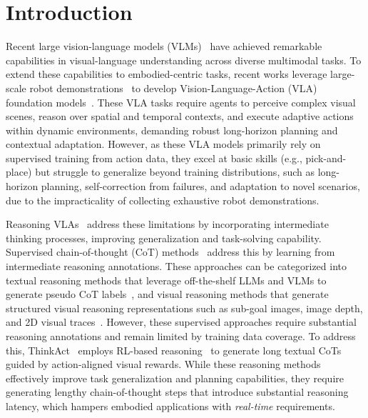 \section{Introduction}
\label{sec:intro}




Recent large vision-language models (VLMs)~\cite{liu2023visual,comanici2025gemini,liu2024nvila,bai2025qwen2,shi2024eagle,li2025eagle,chen2025eagle,wang2025internvl3,xie2024show} have achieved remarkable capabilities in visual-language understanding across diverse multimodal tasks. To extend these capabilities to embodied-centric tasks, recent works leverage large-scale robot demonstrations~\cite{o2024open} to develop Vision-Language-Action (VLA) foundation models~\cite{brohan2022rt,brohan2023rt,team2024octo,bjorck2025gr00t,li2025hamster,black2024pi_0,yang2025magma,kim24openvla}. These VLA tasks require agents to perceive complex visual scenes, reason over spatial and temporal contexts, and execute adaptive actions within dynamic environments, demanding robust long-horizon planning and contextual adaptation. However, as these VLA models primarily rely on supervised training from action data, they excel at basic skills (e.g., pick-and-place) but struggle to generalize beyond training distributions, such as long-horizon planning, self-correction from failures, and adaptation to novel scenarios, due to the impracticality of collecting exhaustive robot demonstrations.


Reasoning VLAs~\cite{zawalski2024robotic,zhao2025cot,lee2025molmoact,wu2025you,qu2025eo,huang2025thinkact,kim2025robot} address these limitations by incorporating intermediate thinking processes, improving generalization and task-solving capability. Supervised chain-of-thought (CoT) methods~\cite{zawalski2024robotic,zhao2025cot,lee2025molmoact,qu2025eo} address this by learning from intermediate reasoning annotations. These approaches can be categorized into textual reasoning methods that leverage off-the-shelf LLMs and VLMs to generate pseudo CoT labels~\cite{zawalski2024robotic}, and visual reasoning methods that generate structured visual reasoning representations such as sub-goal images, image depth, and 2D visual traces~\cite{zhao2025cot,lee2025molmoact}. However, these supervised approaches require substantial reasoning annotations and remain limited by training data coverage. To address this, ThinkAct~\cite{huang2025thinkact} employs RL-based reasoning~\cite{shao2024deepseekmath} to generate long textual CoTs guided by action-aligned visual rewards. While these reasoning methods effectively improve task generalization and planning capabilities, they require generating lengthy chain-of-thought steps that introduce substantial reasoning latency, which hampers embodied applications with \emph{real-time} requirements.


